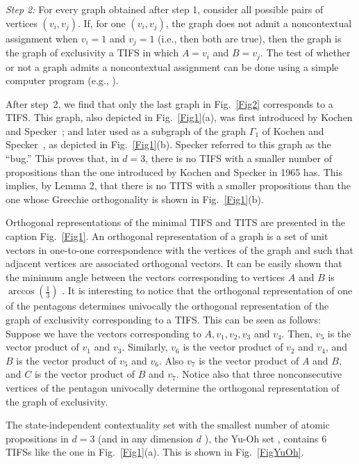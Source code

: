 \documentclass[%
 twocolumn,
 groupedaddress,
 showpacs,
 showkeys,
 preprintnumbers,
 amsmath,amssymb,
 aps,
 pra,
 longbibliography,
 floatfix,
 ]{revtex4-1}
\begin{document}
{\em Step 2:} For every graph obtained after step 1, consider all possible pairs of vertices $(v_i,v_j)$. If, for one $(v_i,v_j)$, the graph does not admit a noncontextual assignment when $v_i=1$ and $v_j=1$ (i.e., then both are true), then the graph is the graph of exclusivity a TIFS in which $A=v_i$ and $B=v_j$. The test of whether or not a graph admits a noncontextual assignment can be done using a simple computer program (e.g., \cite{Peres93}).

After step~2, we find that only the last graph in Fig.~\ref{Fig2} corresponds to a TIFS. This graph, also depicted in Fig.~\ref{Fig1}(a), was first introduced by Kochen and Specker~\cite[Fig.~1, p.~182]{KS65}; and later used as a subgraph of the graph $\Gamma_1$ of Kochen and Specker~\cite{KS67}, as depicted in Fig.~\ref{Fig1}(b). Specker referred to this graph as the ``bug.'' This proves that, in $d=3$, there is no TIFS with a smaller number of propositions than the one introduced by Kochen and Specker in 1965 has. This implies, by Lemma 2, that there is no TITS with a smaller propositions than the one whose Greechie orthogonality is shown in Fig.~\ref{Fig1}(b).


Orthogonal representations of the minimal TIFS and TITS are presented in the caption Fig.~\ref{Fig1}. An orthogonal representation of a graph is a set of unit vectors in one-to-one correspondence with the vertices of the graph and such that adjacent vertices are associated orthogonal vectors. It can be easily shown that the minimum angle between the vectors corresponding to vertices $A$ and $B$ is $\arccos\left(\frac{1}{3}\right)$ \cite{Cabello94,Cabello96}. It is interesting to notice that the orthogonal representation of one of the pentagons determines univocally the orthogonal representation of the graph of exclusivity corresponding to a TIFS. This can be seen as follows: Suppose we have the vectors corresponding to $A,v_1,v_2,v_3$ and $v_4$. Then, $v_5$ is the vector product of
$v_1$ and $v_3$. Similarly, $v_6$ is the vector product of
$v_2$ and $v_4$, and $B$ is the vector product of
$v_5$ and $v_6$. Also $v_7$ is the vector product of
$A$ and $B$, and $C$ is the vector product of
$B$ and $v_7$. Notice also that three nonconsecutive vertices of the pentagon univocally determine the orthogonal representation of the graph of exclusivity.

The state-independent contextuality set with the smallest number of atomic propositions in $d=3$ (and in any dimension $d$ \cite{CKP16}), the Yu-Oh set \cite{YO12}, contains 6 TIFSs like the one in Fig.~\ref{Fig1}(a). This is shown in Fig.~\ref{FigYuOh}.
\end{document}

